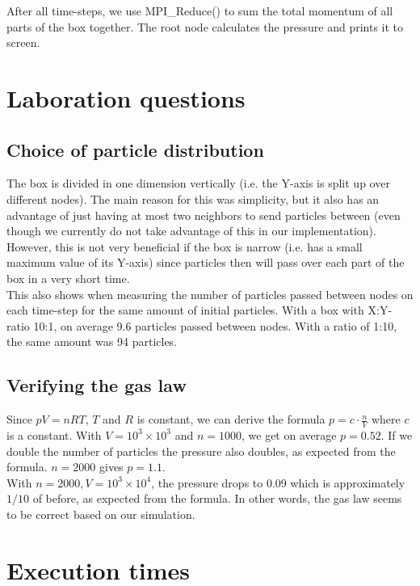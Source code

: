 \documentclass[a4paper]{article}
\begin{document}
After all time-steps, we use MPI\_Reduce() to sum the total momentum of
all parts of the box together. The root node calculates the pressure and
prints it to screen.

\section{Laboration questions}

\subsection{Choice of particle distribution} The box is divided in one
dimension vertically (i.e. the Y-axis is split up over different nodes).
The main reason for this was simplicity, but it also has an advantage of
just having at most two neighbors to send particles between (even
though we currently do not take advantage of this in our
implementation).\\

However, this is not very beneficial if the box is narrow (i.e. has a
small maximum value of its Y-axis) since particles then will pass over
each part of the box in a very short time.\\

This also shows when measuring the number of particles passed between
nodes on each time-step for the same amount of initial particles. With a
box with X:Y-ratio 10:1, on average 9.6 particles passed between nodes.
With a ratio of 1:10, the same amount was 94 particles.\\


\subsection{Verifying the gas law}

Since $pV = nRT$, $T$ and $R$ is constant, we can derive the formula
$p=c\cdot\frac{n}{V}$ where $c$ is a constant. With $V=10^{3} \times
10^{3}$ and $n=1000$, we get on average $p=0.52$. If we double the
number of particles the pressure also doubles, as expected from the
formula. $n=2000$ gives $p=1.1$.\\

With $n=2000, V=10^{3} \times 10^{4}$, the pressure drops to 0.09 which
is approximately $1/10$ of before, as expected from the formula. In
other words, the gas law seems to be correct based on our simulation.\\

\section{Execution times}
\end{document}
